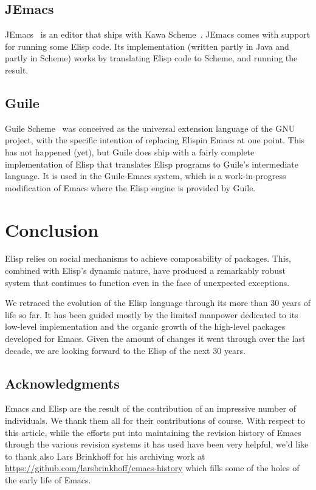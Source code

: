 \documentclass[format=acmsmall, review=false, screen=true]{acmart}
\newcommand \Elisp {Elisp}
\begin{document}
\subsection{JEmacs}

JEmacs~\cite{Bothner2001} is an editor that ships with Kawa
Scheme~\cite{KawaScheme}.  JEmacs comes with support for running some
\Elisp{} code.  Its implementation (written partly in Java and
partly in Scheme) works by translating \Elisp{} code to Scheme, and
running the result.

\subsection{Guile}

Guile Scheme~\cite{Guile2018} was conceived as the universal extension
language of the GNU project, with the specific intention of replacing
\Elisp in Emacs at one point.  This has not happened (yet), but Guile does
ship with a fairly complete implementation of \Elisp{} that translates
\Elisp{} programs to Guile's intermediate language.  It is used in the
Guile-Emacs system, which is a work-in-progress modification of Emacs where
the \Elisp{} engine is provided by Guile.

\section{Conclusion}
\label{sec:conclusion}

\Elisp{} relies on social
mechanisms to achieve composability of packages.  This, combined
with \Elisp's dynamic nature, have produced a remarkably robust
system that continues to function even in the face of unexpected
exceptions.

We retraced the evolution of the \Elisp{} language through its more than 30
years of life so far.  It has been guided mostly by the limited manpower
dedicated to its low-level implementation and the organic growth of the
high-level packages developed for Emacs.  Given the amount of changes it
went through over the last decade, we are looking forward to the \Elisp{} of
the next 30 years.

\subsection{Acknowledgments}

Emacs and \Elisp{} are the result of the contribution of an impressive
number of individuals.  We thank them all for their contributions of course.
With respect to this article, while the efforts put into maintaining the
revision history of Emacs through the various revision systems it has used
have been very helpful, we'd like to thank also Lars Brinkhoff for his
archiving work at \url{https://github.com/larsbrinkhoff/emacs-history} which
fills some of the holes of the early life of Emacs.



\end{document}
